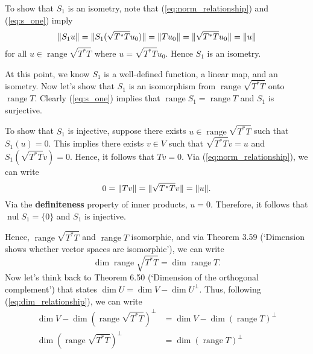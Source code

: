 \documentclass{article}
\begin{document}
To show that $S_1$ is an isometry, note that (\ref{eq:norm_relationship}) and (\ref{eq:s_one}) imply
\begin{equation}\label{eq:norm_relation_s_one}
\lVert S_1 u\rVert=\lVert S_1(\sqrt{T^*T}u_0)\rVert=\lVert Tu_0\rVert=\lVert\sqrt{T^*T}u_0\rVert=\lVert u\rVert
\end{equation}
for all $u\in\operatorname{range}\sqrt{T^*T}$ where $u=\sqrt{T^*T}u_0$. Hence $S_1$ is an isometry.

At this point, we know $S_1$ is a well-defined function, a linear map, and an isometry. Now let's show that $S_1$ is an isomorphism from $\operatorname{range}\sqrt{T^*T}$ onto $\operatorname{range}T$. Clearly (\ref{eq:s_one}) implies that $\operatorname{range}S_1=\operatorname{range}T$ and $S_1$ is surjective. 

To show that $S_1$ is injective, suppose there exists $u\in \operatorname{range}\sqrt{T^*T}$ such that $S_1(u)=0$. This implies there exists $v\in V$ such that $\sqrt{T^*T}v=u$ and $S_1(\sqrt{T^*T}v)=0$. Hence, it follows that $Tv=0$. Via (\ref{eq:norm_relationship}), we can write
\[0=\lVert Tv\rVert=\lVert\sqrt{T^*T}v\rVert=\lVert u\rVert.\]
Via the \textbf{definiteness} property of inner products, $u=0$. Therefore, it follows that $\operatorname{nul}S_1=\{0\}$ and $S_1$ is injective.

Hence, $\operatorname{range}\sqrt{T^*T}$ and $\operatorname{range}T$ isomorphic, and via Theorem 3.59 (`Dimension shows whether vector spaces are isomorphic'), we can write
\begin{equation}\label{eq:dim_relationship}
    \operatorname{dim}\operatorname{range}\sqrt{T^*T}=\operatorname{dim}\operatorname{range}T.
\end{equation}
Now let's think back to Theorem 6.50 (`Dimension of the orthogonal complement') that states $\operatorname{dim}U=\operatorname{dim}V-\operatorname{dim}U^\bot$. Thus, following (\ref{eq:dim_relationship}), we can write
\begin{align*}
    \operatorname{dim}V-\operatorname{dim}(\operatorname{range}\sqrt{T^*T})^\bot&=\operatorname{dim}V-\operatorname{dim}(\operatorname{range}T)^\bot\\
    \operatorname{dim}(\operatorname{range}\sqrt{T^*T})^\bot&=\operatorname{dim}(\operatorname{range}T)^\bot
\end{align*}
\end{document}
